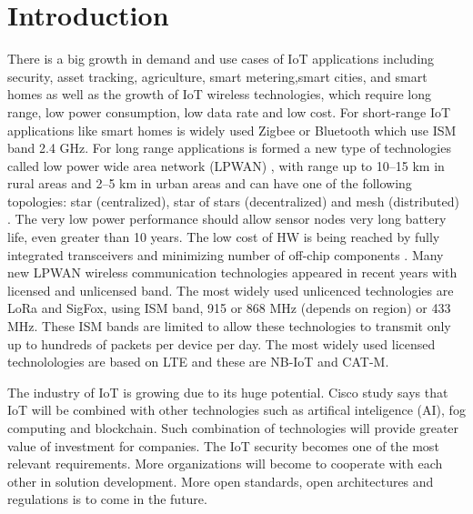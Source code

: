 \chapter{Introduction}
There is a big growth in demand and use cases of IoT applications including security, asset tracking, agriculture, smart metering,smart cities, and smart homes
as well as the growth of IoT wireless technologies, which require long range, low power consumption, low data rate and low cost.
For short-range IoT applications like smart homes is widely used Zigbee or Bluetooth which use ISM band 2.4 GHz.
For long range applications is formed a new type of technologies called low power wide area network (LPWAN) \cite{A comparative study of LPWAN technologies for large-scale IoTdeployment}, with range up to 10–15 km in rural areas and 2–5 km in urban areas \cite{Long-Range Communications in Unlicensed Bands} and can have one of the following topologies: star (centralized), star of stars (decentralized) and mesh (distributed) \cite{high density LPWAN}.
The very low power performance should allow sensor nodes very long battery life, even greater than 10 years.
The low cost of HW is being reached by fully integrated transceivers and minimizing number of off-chip components \cite{MURS Band for LPWAN Applications}.
Many new LPWAN wireless communication technologies appeared in recent years with licensed and unlicensed band.
The most widely used unlicenced technologies are LoRa and SigFox, using ISM band, 915 or 868 MHz (depends on region) or 433 MHz. These ISM bands are limited to allow these technologies to transmit only up to hundreds of packets per device per day.
The most widely used licensed technolologies are based on LTE and these are NB-IoT and CAT-M.

The industry of IoT is growing due to its huge potential.
Cisco study \cite{IoT cisco study} says that IoT will be combined with other technologies such as artifical inteligence (AI), fog computing and blockchain. Such combination of technologies will provide greater value of investment for companies. 
The IoT security becomes one of the most relevant requirements.
More organizations will become to cooperate with each other in solution development.
More open standards, open architectures and regulations is to come in the future.


